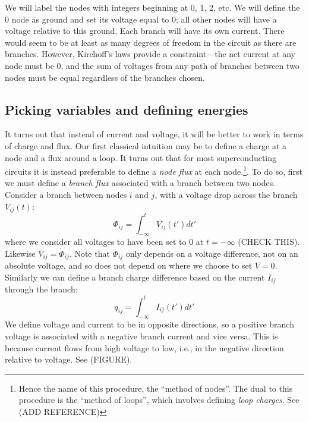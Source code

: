 We will label the nodes with integers beginning at 0, 1, 2, etc. We will define the 0 node as ground and set its voltage equal to 0; all other nodes will have a voltage relative to this ground. Each branch will have its own current. There would seem to be at least as many degrees of freedom in the circuit as there are branches. However, Kirchoff's laws provide a constraint---the net current at any node must be 0, and the sum of voltages from any path of branches between two nodes must be equal regardless of the branches chosen.

\subsection{Picking variables and defining energies}
It turns out that instead of current and voltage, it will be better to work in terms of charge and flux. Our first classical intuition may be to define a charge at a node and a flux around a loop. It turns out that for most superconducting circuits it is instead preferable to define a \textit{node flux} at each node.\footnote{Hence the name of this procedure, the ``method of nodes''. The dual to this procedure is the ``method of loops'', which involves defining \textit{loop charges}. See (ADD REFERENCE)}. To do so, first we must define a \textit{branch flux} associated with a branch between two nodes. Consider a branch between nodes $i$ and $j$, with a voltage drop across the branch $V_{ij}(t)$: 
\begin{equation}
    \Phi_{ij} = \int_{-\infty}^tV_{ij}(t')dt'
\end{equation}
where we consider all voltages to have been set to 0 at $t=-\infty$ (CHECK THIS). Likewise $V_{ij} = \dot{\Phi}_{ij}$. Note that $\Phi_{ij}$ only depends on a voltage difference, not on an absolute voltage, and so does not depend on where we choose to set $V=0$. %
Similarly we can define a branch charge difference based on the current $I_{ij}$ through the branch:
\begin{equation}
    q_{ij} = \int_{-\infty}^tI_{ij}(t')dt'
\end{equation}
We define voltage and current to be in opposite directions, so a positive branch voltage is associated with a negative branch current and vice versa. This is because current flows from high voltage to low, i.e., in the negative direction relative to voltage. See (FIGURE).

